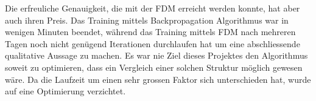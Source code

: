 Die erfreuliche Genauigkeit, die mit der FDM erreicht werden konnte, hat aber auch ihren Preis. Das Training mittels Backpropagation Algorithmus war in wenigen Minuten beendet, während das Training mittels FDM nach mehreren Tagen noch nicht genügend Iterationen durchlaufen hat um eine abschliessende qualitative Aussage zu machen. Es war nie Ziel dieses Projektes den Algorithmus soweit zu optimieren, dass ein Vergleich einer solchen Struktur möglich gewesen wäre. Da die Laufzeit um einen sehr grossen Faktor sich unterschieden hat, wurde auf eine Optimierung verzichtet. 